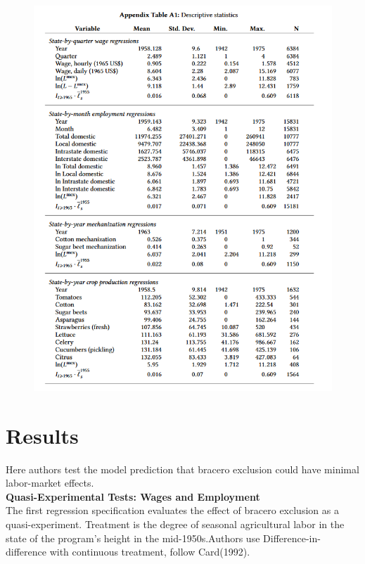 \documentclass[../root]{subfiles}
\begin{document}
    
    \begin{figure}
        \centering
        \includegraphics[width = \linewidth]{0731sugiyama/TableA1.png}
        \label{fig:my_label}
    \end{figure}
    
    \section{Results}
    
    Here authors test the model prediction that bracero exclusion could have minimal labor-market effects. \\
    {\bf Quasi-Experimental Tests: Wages and Employment} \\
    The first regression specification evaluates the effect of bracero exclusion as a quasi-experiment. Treatment is the degree of seasonal agricultural labor in the state of the program's height in the mid-1950s.Authors use Difference-in-difference with continuous treatment, follow Card(1992).
    
\end{document}
